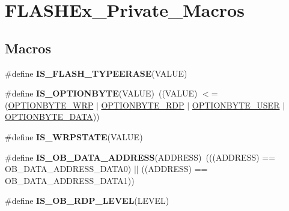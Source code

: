 \hypertarget{group___f_l_a_s_h_ex___private___macros}{}\section{F\+L\+A\+S\+H\+Ex\+\_\+\+Private\+\_\+\+Macros}
\label{group___f_l_a_s_h_ex___private___macros}
\subsection*{Macros}
\begin{DoxyCompactItemize}
\item 
\#define {\bfseries I\+S\+\_\+\+F\+L\+A\+S\+H\+\_\+\+T\+Y\+P\+E\+E\+R\+A\+SE}(V\+A\+L\+UE)
\item 
\mbox{\label{group___f_l_a_s_h_ex___private___macros_ga87cd48c2373f47668470a38892ed07e3}} 
\#define {\bfseries I\+S\+\_\+\+O\+P\+T\+I\+O\+N\+B\+Y\+TE}(V\+A\+L\+UE)~((V\+A\+L\+UE) $<$= (\hyperlink{group___f_l_a_s_h_ex___o_b___type_ga48712a166ea192ddcda0f2653679f9ec}{O\+P\+T\+I\+O\+N\+B\+Y\+T\+E\+\_\+\+W\+RP} $\vert$ \hyperlink{group___f_l_a_s_h_ex___o_b___type_ga8f0bdb21ef13bae39d5d8b6619e2df06}{O\+P\+T\+I\+O\+N\+B\+Y\+T\+E\+\_\+\+R\+DP} $\vert$ \hyperlink{group___f_l_a_s_h_ex___o_b___type_gac7d843e666e15c79688a1914e8ffe7a5}{O\+P\+T\+I\+O\+N\+B\+Y\+T\+E\+\_\+\+U\+S\+ER} $\vert$ \hyperlink{group___f_l_a_s_h_ex___o_b___type_gad0c29c84acfb46de1708a670529175a5}{O\+P\+T\+I\+O\+N\+B\+Y\+T\+E\+\_\+\+D\+A\+TA}))
\item 
\#define {\bfseries I\+S\+\_\+\+W\+R\+P\+S\+T\+A\+TE}(V\+A\+L\+UE)
\item 
\mbox{\label{group___f_l_a_s_h_ex___private___macros_ga73fcac8d5f301a5c98518374ae926633}} 
\#define {\bfseries I\+S\+\_\+\+O\+B\+\_\+\+D\+A\+T\+A\+\_\+\+A\+D\+D\+R\+E\+SS}(A\+D\+D\+R\+E\+SS)~(((A\+D\+D\+R\+E\+SS) == O\+B\+\_\+\+D\+A\+T\+A\+\_\+\+A\+D\+D\+R\+E\+S\+S\+\_\+\+D\+A\+T\+A0) $\vert$$\vert$ ((A\+D\+D\+R\+E\+SS) == O\+B\+\_\+\+D\+A\+T\+A\+\_\+\+A\+D\+D\+R\+E\+S\+S\+\_\+\+D\+A\+T\+A1))
\item 
\#define {\bfseries I\+S\+\_\+\+O\+B\+\_\+\+R\+D\+P\+\_\+\+L\+E\+V\+EL}(L\+E\+V\+EL)
\item 
\mbox{\label{group___f_l_a_s_h_ex___private___macros_gaf2871652c08e76499d9449be6556f12c}} 
$$
\end{DoxyCompactItemize}
